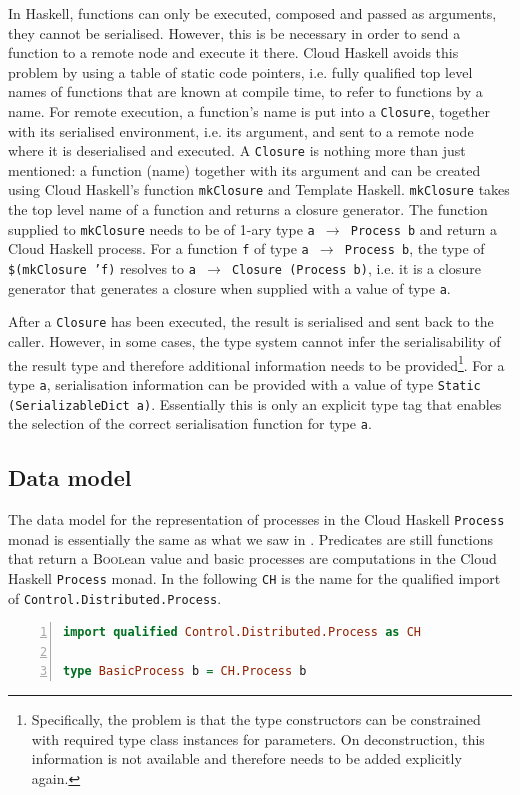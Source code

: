 In \textsf{Haskell}, functions can only be executed, composed and passed as arguments, they cannot be serialised. However, this is be necessary in order to send a function to a remote node and execute it there. \textsf{Cloud Haskell} avoids this problem by using a table of static code pointers, i.e. fully qualified top level names of functions that are known at compile time, to refer to functions by a name. For remote execution, a function's name is put into a \texttt{Closure}, together with its serialised environment, i.e. its argument, and sent to a remote node where it is deserialised and executed. A \texttt{Closure} is nothing more than just mentioned: a function (name) together with its argument \cite{Epstein:2011:THC:2034675.2034690} and can be created using \textsf{Cloud Haskell}'s function \texttt{mkClosure} and \textsf{Template Haskell}. \texttt{mkClosure} takes the top level name of a function and returns a closure generator. The function supplied to \texttt{mkClosure} needs to be of 1-ary type \texttt{a $\to$ Process b} and return a \textsf{Cloud Haskell} process. For a function \texttt{f} of type \texttt{a $\to$ Process b}, the type of \texttt{\$(mkClosure 'f)} resolves to \texttt{a $\to$ Closure (Process b)}, i.e. it is a closure generator that generates a closure when supplied with a value of type \texttt{a}.

After a \texttt{Closure} has been executed, the result is serialised and sent back to the caller. However, in some cases, the type system cannot infer the serialisability of the result type and therefore additional information needs to be provided\footnote{Specifically, the problem is that the type constructors can be constrained with required type class instances for parameters. On deconstruction, this information is not available and therefore needs to be added explicitly again.}. For a type \texttt{a}, serialisation information can be provided with a value of type \texttt{Static (SerializableDict a)}. Essentially this is only an explicit type tag that enables the selection of the correct serialisation function for type \texttt{a}.

\subsection{Data model}
\label{chp:distributed_model}
The data model for the representation of processes in the \textsf{Cloud Haskell} \texttt{Process} monad is essentially the same as what we saw in . Predicates are still functions that return a \textsc{Bool}ean value and basic processes are computations in the \textsf{Cloud Haskell} \texttt{Process} monad. In the following \texttt{CH} is the name for the qualified import of \texttt{Control.Distributed.Process}.
\begin{lstlisting}[language=Haskell,caption=Representation of basic processes as computations in the \texttt{Process} monad.,numbers=left,frame=bt]
import qualified Control.Distributed.Process as CH

type BasicProcess b = CH.Process b
\end{lstlisting}

